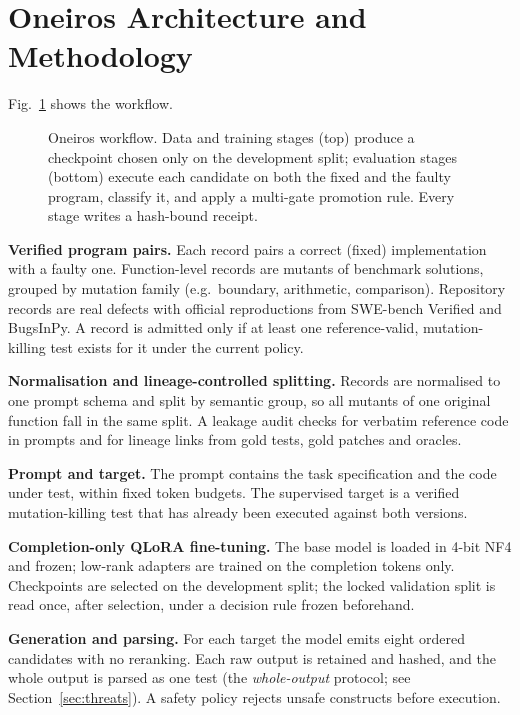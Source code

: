 \documentclass[conference,a4paper]{IEEEtran}
\begin{document}
\section{Oneiros Architecture and Methodology}

Fig.~\ref{fig:workflow} shows the workflow.

\begin{figure}[t]
\centering

\caption{Oneiros workflow. Data and training stages (top) produce a checkpoint chosen
only on the development split; evaluation stages (bottom) execute each candidate on
both the fixed and the faulty program, classify it, and apply a multi-gate promotion
rule. Every stage writes a hash-bound receipt.}
\label{fig:workflow}
\end{figure}

\textbf{Verified program pairs.} Each record pairs a correct (fixed) implementation
with a faulty one. Function-level records are mutants of benchmark solutions, grouped
by mutation family (e.g.\ boundary, arithmetic, comparison). Repository records are
real defects with official reproductions from SWE-bench Verified and BugsInPy. A record
is admitted only if at least one reference-valid, mutation-killing test exists for it
under the current policy.

\textbf{Normalisation and lineage-controlled splitting.} Records are normalised to one
prompt schema and split by semantic group, so all mutants of one original function
fall in the same split. A leakage audit checks for verbatim reference code in prompts
and for lineage links from gold tests, gold patches and oracles.

\textbf{Prompt and target.} The prompt contains the task specification and the code
under test, within fixed token budgets. The supervised target is a verified
mutation-killing test that has already been executed against both versions.

\textbf{Completion-only QLoRA fine-tuning.} The base model is loaded in 4-bit NF4 and
frozen; low-rank adapters are trained on the completion tokens only. Checkpoints are
selected on the development split; the locked validation split is read once, after
selection, under a decision rule frozen beforehand.

\textbf{Generation and parsing.} For each target the model emits eight ordered
candidates with no reranking. Each raw output is retained and hashed, and the whole
output is parsed as one test (the \emph{whole-output} protocol; see
Section~\ref{sec:threats}). A safety policy rejects unsafe constructs before execution.
\end{document}
